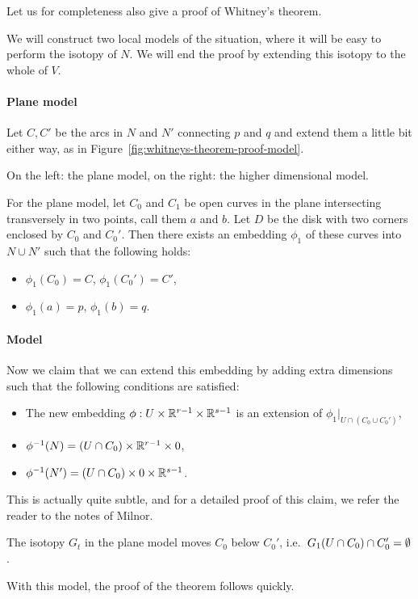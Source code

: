 Let us for completeness also give a proof of Whitney's theorem.
\begin{myproof}
    \label{proof:whitney}
    We will construct two local models of the situation, where it will be easy to perform the isotopy of $N$. We will end the proof by extending this isotopy to the whole of $V$.

    \paragraph{Plane model}
    Let $C, C'$ be the arcs in  $N$ and $N'$ connecting $p$ and  $q$ and extend them a little bit either way, as in Figure~\ref{fig:whitneys-theorem-proof-model}.
    \begin{marginfigure}
        \center
        \caption{On the left: the plane model, on the right: the higher dimensional model.}
        \label{fig:whitneys-theorem-proof-model}
    \end{marginfigure}
    For the plane model, let $C_0$ and $ C_1$ be open curves in the plane intersecting transversely in two points, call them $a$ and $b$.
    Let $D$ be the disk with two corners enclosed by $C_0$ and $C_0'$.
    Then there exists an embedding $\phi_1$ of these curves into $N \cup N'$ such that the following holds:
     \begin{itemize}
         \item $\phi_1(C_0) = C$, $\phi_1(C_0') = C'$,
         \item $\phi_1(a) = p$, $\phi_1(b) = q$.
    \end{itemize}
    \paragraph{Model}
    Now we claim that we can extend this embedding by adding extra dimensions such that the following conditions are satisfied:
    \begin{itemize}
        \item The new embedding $\phi: U \times \mathbb{R}^{r-1} \times \mathbb{R}^{s-1}$ is an extension of $\phi_1|_{U \cap (C_0 \cup C_0')}$,
        \item $\phi^{-1}(N) = (U \cap C_0) \times \mathbb{R}^{r-1} \times 0$,
            \item $\phi^{-1}(N') = (U \cap C_0) \times 0\times \mathbb{R}^{s-1}$.
    \end{itemize}
    This is actually quite subtle, and for a detailed proof of this claim, we refer the reader to the notes of Milnor.
    \begin{marginfigure}
        \centering
        \caption{The isotopy $G_t$ in the plane model moves $C_0$ below $ C_0'$, i.e.\ $ G_1(U \cap C_0) \cap C_0' = \emptyset$.}
        \label{fig:whitneys-theorem-model-isotopy}
    \end{marginfigure}
    With this model, the proof of the theorem follows quickly.

\end{myproof}

